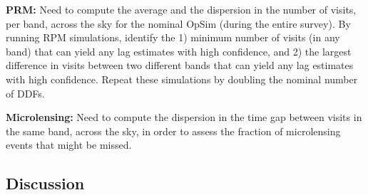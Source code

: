 {\bf PRM:} Need to compute the average and the dispersion in the number of visits, per band, across the sky
for the nominal OpSim (during the entire survey). By running RPM simulations, identify the 1) minimum number of visits (in any band) that can yield any lag estimates with high confidence, and 2) the largest difference in visits between two
different bands that can yield any lag estimates with high confidence. Repeat these simulations by doubling the nominal number of DDFs.

{\bf Microlensing:} Need to compute the dispersion in the time gap between visits in the same band, across the sky,
in order to assess the fraction of microlensing events that might be missed.


\subsection{Discussion}
\label{sec:\secname:discussion}


\navigationbar
